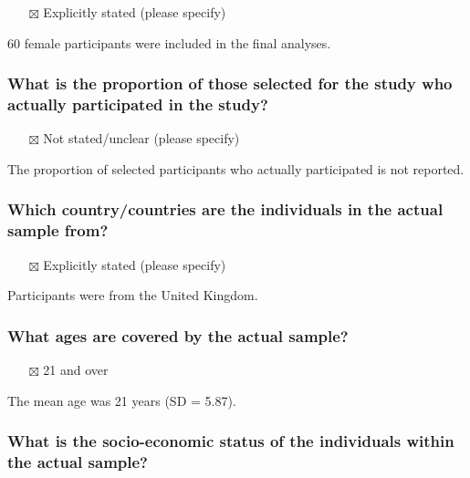 \documentclass[
  doc, a4paper]{apa7}
\providecommand{\tightlist}{%
  \setlength{\itemsep}{0pt}\setlength{\parskip}{0pt}}
\begin{document}
\begin{itemize}
\tightlist
\item[$\boxtimes$]
  Explicitly stated (please specify)
\end{itemize}

60 female participants were included in the final analyses.

\subsubsection{What is the proportion of those selected for the study who actually participated in the study?}\label{what-is-the-proportion-of-those-selected-for-the-study-who-actually-participated-in-the-study}

\begin{itemize}
\tightlist
\item[$\boxtimes$]
  Not stated/unclear (please specify)
\end{itemize}

The proportion of selected participants who actually participated is not reported.

\subsubsection{Which country/countries are the individuals in the actual sample from?}\label{which-countrycountries-are-the-individuals-in-the-actual-sample-from}

\begin{itemize}
\tightlist
\item[$\boxtimes$]
  Explicitly stated (please specify)
\end{itemize}

Participants were from the United Kingdom.

\subsubsection{What ages are covered by the actual sample?}\label{what-ages-are-covered-by-the-actual-sample}

\begin{itemize}
\tightlist
\item[$\boxtimes$]
  21 and over
\end{itemize}

The mean age was 21 years (SD = 5.87).

\subsubsection{What is the socio-economic status of the individuals within the actual sample?}\label{what-is-the-socio-economic-status-of-the-individuals-within-the-actual-sample}
\end{document}
